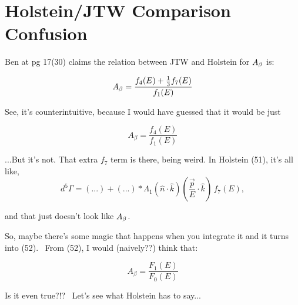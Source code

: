 


\chapter[Holstein/JTW Comparison Confusion]{Holstein/JTW Comparison Confusion}




Ben at pg 17(30) claims the relation between JTW and Holstein for $A_{\beta}$ is:

\begin{equation}
A_{\beta} = \frac{f_4(E)+ \frac{1}{3}f_7(E)}{f_1(E)}
\end{equation}

See, it's counterintuitive, because I would have guessed that it would be just

\begin{equation}
A_\beta = \frac{f_4(E)}{f_1(E)}
\end{equation}

...But it's not.  That extra $f_7$ term is there, being weird.  In Holstein (51), it's all like, 
\begin{equation}
d^5\Gamma = (...) + (...)*\Lambda_1 (\hat{n} \cdot \hat{k}) (\frac{\vec{p}}{E}\cdot \hat{k} )\,f_7(E), 
\end{equation}

and that just doesn't look like $A_{\beta}$.

So, maybe there's some magic that happens when you integrate it and it turns into (52). 
From (52), I would (naively??) think that:

\begin{equation}
A_\beta = \frac{F_1(E)}{F_0(E)}
\end{equation}

Is it even true?!?  Let's see what Holstein has to say...

